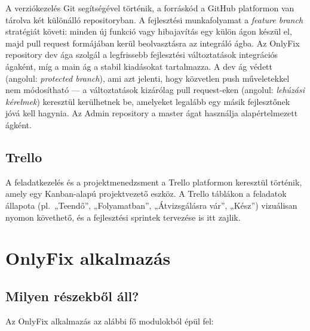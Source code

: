 \documentclass[colorlinks]{thesis-kando}
\begin{document}
A verziókezelés Git segítségével történik, a forráskód a GitHub platformon van tárolva két különálló repositoryban. A fejlesztési munkafolyamat a \emph{feature branch} stratégiát követi: minden új funkció vagy hibajavítás egy külön ágon készül el, majd pull request formájában kerül beolvasztásra az integráló ágba. Az OnlyFix repository dev ága szolgál a legfrissebb fejlesztési változtatások integrációs ágaként, míg a main ág a stabil kiadásokat tartalmazza. A dev ág védett (angolul: \emph{protected branch}), ami azt jelenti, hogy közvetlen push műveletekkel nem módosítható --- a változtatások kizárólag pull request-eken (angolul: \emph{lehúzási kérelmek}) keresztül kerülhetnek be, amelyeket legalább egy másik fejlesztőnek jóvá kell hagynia. Az Admin repository a master ágat használja alapértelmezett ágként.

\section{Trello}

A feladatkezelés és a projektmenedzsment a Trello platformon keresztül történik, amely egy Kanban-alapú projektvezető eszköz. A Trello táblákon a feladatok állapota (pl.\ „Teendő'', „Folyamatban'', „Átvizsgálásra vár'', „Kész'') vizuálisan nyomon követhető, és a fejlesztési sprintek tervezése is itt zajlik.

\chapter{OnlyFix alkalmazás}

\section{Milyen részekből áll?}

Az OnlyFix alkalmazás az alábbi fő modulokból épül fel:
\end{document}
